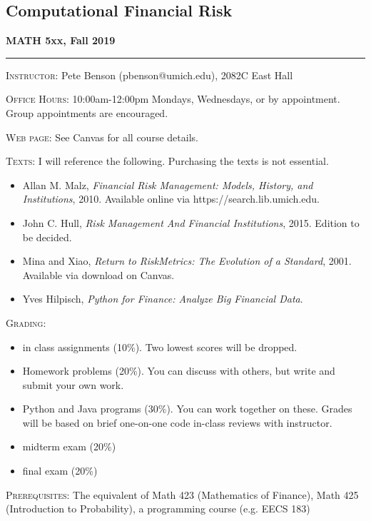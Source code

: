 \documentclass[11pt]{article}
\begin{document}
\begin{center}
\section*{Computational Financial Risk}
{\bf MATH 5xx, Fall 2019}
\end{center}

\vspace{3mm}
\hrule
\vspace{3mm}

\textsc{Instructor:} Pete Benson (pbenson@umich.edu),  2082C East Hall

\textsc{Office Hours:} 10:00am-12:00pm Mondays, Wednesdays, or by appointment. Group appointments are encouraged.

\textsc{Web page:}  See Canvas for all course details.

\textsc{Texts:}  I will reference the following. Purchasing the texts is not essential. 
\begin{itemize}
	\item Allan M. Malz, {\it Financial Risk Management: Models, History, and Institutions}, 2010. Available online via https://search.lib.umich.edu.
	\item John C. Hull, {\it Risk Management And Financial Institutions}, 2015. Edition to be decided. 
	\item Mina and Xiao, {\it Return to RiskMetrics: The Evolution of a Standard}, 2001. Available via download on Canvas.
	\item Yves Hilpisch, {\it Python for Finance: Analyze Big Financial Data}.
\end{itemize}

\textsc{Grading:}  
\begin{itemize}
	\item in class assignments (10\%). Two lowest scores will be dropped. 
	\item Homework problems (20\%). You can discuss with others, but write and submit your own work. 
	\item Python and Java programs (30\%). You can work together on these. Grades will be based on brief one-on-one code in-class reviews with instructor. 
	\item midterm exam (20\%)
	\item final exam (20\%)
\end{itemize}


\textsc{Prerequisites:}
The equivalent of Math 423 (Mathematics of Finance), Math 425 (Introduction to Probability), a programming course (e.g. EECS 183)
\end{document}
